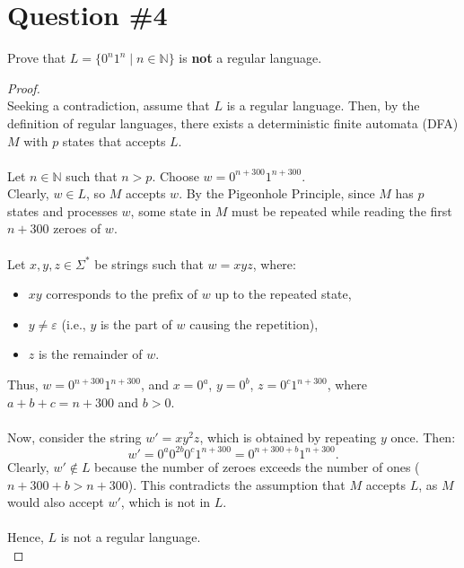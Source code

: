 \documentclass[12pt]{article}
\begin{document}
\section*{Question \#4}
Prove that \( L = \{ 0^n1^n \mid n \in \mathbb{N} \} \) is \textbf{not} a regular language.\begin{proof}
\leavevmode\\
    Seeking a contradiction, assume that \( L \) is a regular language. Then, by the definition of regular languages, there exists a deterministic finite automata (DFA) \( M \) with \( p \) states that accepts \( L \). \\
    \\
    Let \( n \in \mathbb{N} \) such that \( n > p \). Choose \( w = 0^{n + 300}1^{n + 300} \). \\
    Clearly, \( w \in L \), so \( M \) accepts \( w \). By the Pigeonhole Principle, since \( M \) has \( p \) states and processes \( w \), some state in \( M \) must be repeated while reading the first \( n + 300 \) zeroes of \( w \). \\
    \\
    Let \( x, y, z \in \Sigma^* \) be strings such that \( w = xyz \), where:
    \begin{itemize}
        \item \( xy \) corresponds to the prefix of \( w \) up to the repeated state,
        \item \( y \neq \varepsilon \) (i.e., \( y \) is the part of \( w \) causing the repetition),
        \item \( z \) is the remainder of \( w \).
    \end{itemize}
    Thus, \( w = 0^{n + 300}1^{n + 300} \), and \( x = 0^a \), \( y = 0^b \), \( z = 0^c1^{n+300} \), where \( a + b + c = n + 300 \) and \( b > 0 \). \\
    \\
    Now, consider the string \( w' = xy^2z \), which is obtained by repeating \( y \) once. Then:
    \[
    w' = 0^a0^{2b}0^c1^{n+300} = 0^{n + 300 + b}1^{n + 300}.
    \]
    Clearly, \( w' \notin L \) because the number of zeroes exceeds the number of ones (\( n + 300 + b > n + 300 \)). This contradicts the assumption that \( M \) accepts \( L \), as \( M \) would also accept \( w' \), which is not in \( L \). \\
    \\
    Hence, \( L \) is not a regular language. \\
\end{proof}
\pagebreak
\end{document}
